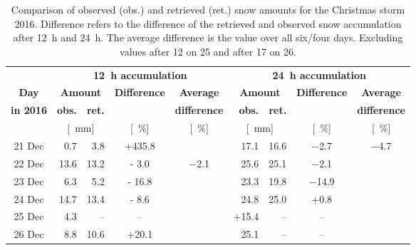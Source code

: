 \begin{table}[t!]
	\begin{center}
		\caption{Comparison of observed (obs.) and retrieved (ret.) snow amounts for the Christmas storm 2016. Difference refers to the difference of the retrieved and observed snow accumulation after \SI{12}{\hour} and \SI{24}{\hour}. The average difference is the value over all six/four days. Excluding values after \SI{12}{\UTC} on \SI{25}{\dec} and after \SI{17}{\UTC} on \SI{26}{\dec}.}\label{tab:res:ret_error}
		\begin{tabular}{c||r|r|c|c||r|r|c|c}
			\hline \hline
			& \multicolumn{4}{c||}{\textbf{\SI{12}{\hour} accumulation}} & \multicolumn{4}{c}{\textbf{\SI{24}{\hour} accumulation}}    \\ \cline{2-9}
			\textbf{Day} & \multicolumn{2}{c|}{\textbf{Amount}} & \textbf{Difference} & \textbf{Average} &  \multicolumn{2}{c|}{\textbf{Amount}} & \textbf{Difference} & \textbf{Average}  \\\cline{2-3} \cline{6-7}
			\textbf{in 2016} & \textbf{obs.} & \textbf{ret.} & & \textbf{difference} & \textbf{obs.} & \textbf{ret.} & & \textbf{difference} \\\cline{2-9}
			& \multicolumn{2}{c|}{[\SI{}{\mm}]} & [\SI{}{\percent}] & [\SI{}{\percent}] & \multicolumn{2}{c|}{[\SI{}{\mm}]} & [\SI{}{\percent}] & [\SI{}{\percent}] \\ \hline\hline
			\num{21} Dec & \num{0.7} & \num{3.8} & +\num{435.8} &  & \num{17.1} & \num{16.6} & \num{-2.7} & \multirow{4}{*}{\num{-4.7}}   \\\cline{1-5}\cline{6-8}
			\num{22} Dec & \num{13.6}& \num{13.2} & \num{- 3.0} & \multirow{5}{*}{\num{-2.1}} & \num{25.6} &\num{25.1} & \num{-2.1} &   \\\cline{1-4}\cline{6-8}
			\num{23} Dec & \num{6.3} &\num{5.2} & \num{- 16.8} & & \num{23.3}& \num{19.8} & \num{-14.9} &   \\\cline{1-4}\cline{6-8}
			\num{24} Dec & \num{14.7} & \num{13.4} & \num{- 8.6} && \num{24.8} & \num{25.0} & +\num{0.8} &   \\\cline{1-4}\cline{6-9}
			\num{25} Dec &  \num{4.3} & -- & -- & & +\num{15.4} & -- & -- & \\\cline{1-4}\cline{6-9}
			\num{26} Dec & \num{8.8} & \num{10.6} & +\num{20.1} &  &  \num{25.1} &-- & -- &  \\\hline\hline
		\end{tabular}
	\end{center}
\end{table}
